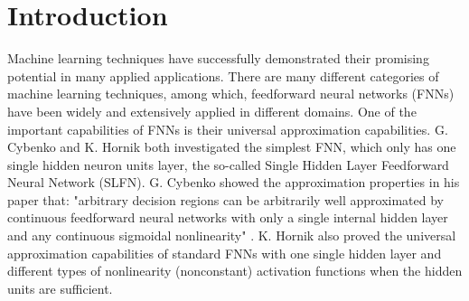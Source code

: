 \documentclass[a4paper, 14pt]{extarticle}
\begin{document}
\begin{abstract}
\end{abstract}
\newpage
\section{Introduction}
\par Machine learning techniques have successfully demonstrated their promising potential in many applied applications. There are many different categories of machine learning techniques, among which, feedforward neural networks (FNNs) have been widely and extensively applied in different domains. One of the important capabilities of FNNs is their universal approximation capabilities. G. Cybenko and K. Hornik both investigated the simplest FNN, which only has one single hidden neuron units layer, the so-called Single Hidden Layer Feedforward Neural Network (SLFN). G. Cybenko showed the approximation properties in his paper that: "arbitrary decision regions can be arbitrarily well approximated by continuous feedforward neural networks with only a single internal hidden layer and any continuous sigmoidal nonlinearity" \cite{Cybenko1989ApproximationBS}. K. Hornik also proved the universal approximation capabilities of standard FNNs with one single hidden layer and different types of nonlinearity (nonconstant) activation functions when the hidden units are sufficient\cite{HORNIK1991251}. 
\end{document}
